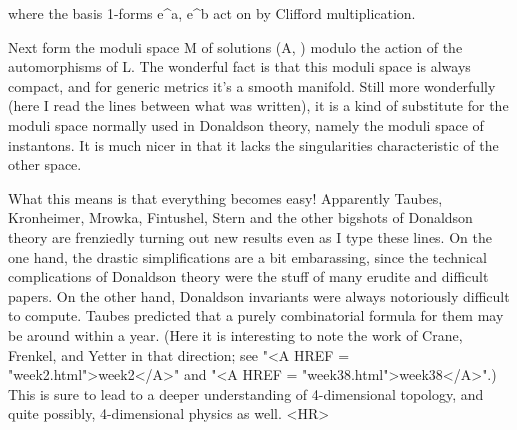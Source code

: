 where the basis 1-forms e^a, e^b act on \Psi  by Clifford multiplication.

Next form the moduli space M of solutions (A, \Psi ) modulo the action of
the automorphisms of L.  The wonderful fact is that this moduli space is
always compact, and for generic metrics it's a smooth manifold.  Still
more wonderfully (here I read the lines between what was written), it is
a kind of substitute for the moduli space normally used in Donaldson
theory, namely the moduli space of instantons.  It is much nicer in that
it lacks the singularities characteristic of the other space.

What this means is that everything becomes easy!  Apparently Taubes,
Kronheimer, Mrowka, Fintushel, Stern and the other bigshots of Donaldson
theory are frenziedly turning out new results even as I type these
lines.  On the one hand, the drastic simplifications are a bit
embarassing, since the technical complications of Donaldson theory were
the stuff of many erudite and difficult papers.  On the other hand, 
Donaldson invariants were always notoriously difficult to compute.  
Taubes predicted that a purely combinatorial formula for them may be
around within a year.  (Here it is interesting to note the work of
Crane, Frenkel, and Yetter in that direction; see "<A HREF = "week2.html">week2</A>" and "<A HREF = "week38.html">week38</A>".)
This is sure to lead to a deeper understanding of 4-dimensional
topology, and quite possibly, 4-dimensional physics as well.
<HR>



